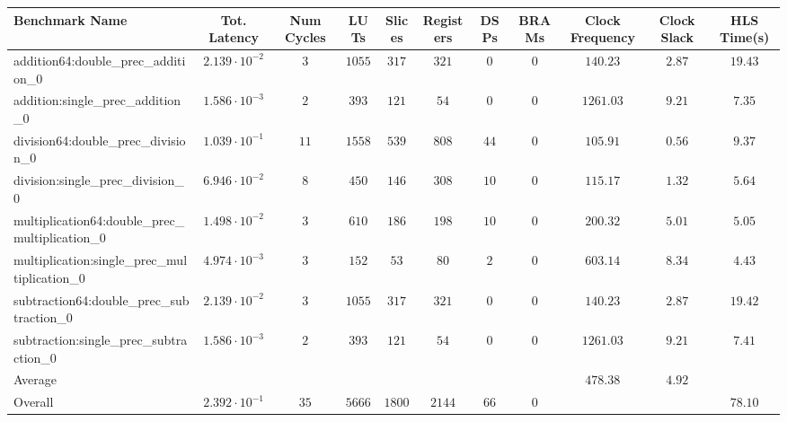 \begin{tabular}{|l|c|c|c|c|c|c|c|c|c|c|}
\hline
Benchmark Name                                   & Tot. Latency            & Num Cycles & LUTs     & Slices   & Registers & DSPs   & BRAMs & Clock Frequency & Clock Slack & HLS Time(s) \\
\hline
addition64:double\_prec\_addition\_0             & $ 2.139 \cdot 10^{-2} $ & $ 3      $ & $ 1055 $ & $ 317  $ & $ 321   $ & $ 0  $ & $ 0 $ & $ 140.23      $ & $ 2.87    $ & $ 19.43   $ \\
addition:single\_prec\_addition\_0               & $ 1.586 \cdot 10^{-3} $ & $ 2      $ & $ 393  $ & $ 121  $ & $ 54    $ & $ 0  $ & $ 0 $ & $ 1261.03     $ & $ 9.21    $ & $ 7.35    $ \\
division64:double\_prec\_division\_0             & $ 1.039 \cdot 10^{-1} $ & $ 11     $ & $ 1558 $ & $ 539  $ & $ 808   $ & $ 44 $ & $ 0 $ & $ 105.91      $ & $ 0.56    $ & $ 9.37    $ \\
division:single\_prec\_division\_0               & $ 6.946 \cdot 10^{-2} $ & $ 8      $ & $ 450  $ & $ 146  $ & $ 308   $ & $ 10 $ & $ 0 $ & $ 115.17      $ & $ 1.32    $ & $ 5.64    $ \\
multiplication64:double\_prec\_multiplication\_0 & $ 1.498 \cdot 10^{-2} $ & $ 3      $ & $ 610  $ & $ 186  $ & $ 198   $ & $ 10 $ & $ 0 $ & $ 200.32      $ & $ 5.01    $ & $ 5.05    $ \\
multiplication:single\_prec\_multiplication\_0   & $ 4.974 \cdot 10^{-3} $ & $ 3      $ & $ 152  $ & $ 53   $ & $ 80    $ & $ 2  $ & $ 0 $ & $ 603.14      $ & $ 8.34    $ & $ 4.43    $ \\
subtraction64:double\_prec\_subtraction\_0       & $ 2.139 \cdot 10^{-2} $ & $ 3      $ & $ 1055 $ & $ 317  $ & $ 321   $ & $ 0  $ & $ 0 $ & $ 140.23      $ & $ 2.87    $ & $ 19.42   $ \\
subtraction:single\_prec\_subtraction\_0         & $ 1.586 \cdot 10^{-3} $ & $ 2      $ & $ 393  $ & $ 121  $ & $ 54    $ & $ 0  $ & $ 0 $ & $ 1261.03     $ & $ 9.21    $ & $ 7.41    $ \\
\hline
Average                                          & $                     $ & $        $ & $      $ & $      $ & $       $ & $    $ & $   $ & $ 478.38      $ & $ 4.92    $ & $         $ \\
\hline
Overall                                          & $ 2.392 \cdot 10^{-1} $ & $ 35     $ & $ 5666 $ & $ 1800 $ & $ 2144  $ & $ 66 $ & $ 0 $ & $             $ & $         $ & $ 78.10   $ \\
\hline
\end{tabular}

